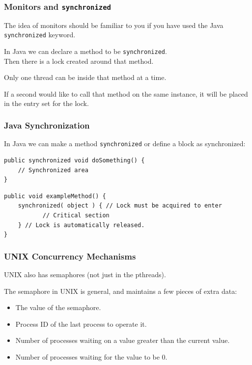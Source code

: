 \begin{frame}
\frametitle{Monitors and \texttt{synchronized}}

The idea of monitors should be familiar to you if you have used the Java \texttt{synchronized} keyword. 

In Java we can declare a method to be \texttt{synchronized}.\\
\quad Then there is a lock created around that method. 

Only one thread can be inside that method at a time.

If a second would like to call that method on the same instance, it will be placed in the entry set for the lock.

\end{frame}

\begin{frame}[fragile]
\frametitle{Java Synchronization}


In Java we can make a method \texttt{synchronized} or define a block as synchronized:

\begin{verbatim}
public synchronized void doSomething() {
    // Synchronized area
}
\end{verbatim}



\begin{verbatim}
public void exampleMethod() {
    synchronized( object ) { // Lock must be acquired to enter
           // Critical section 
    } // Lock is automatically released.
}
\end{verbatim}


\end{frame}

\begin{frame}
\frametitle{UNIX Concurrency Mechanisms}

UNIX also has semaphores (not just in the pthreads). 

The semaphore in UNIX is general, and maintains a few pieces of extra data:

\begin{itemize}
    \item The value of the semaphore.
    \item Process ID of the last process to operate it.
    \item Number of processes waiting on a value greater than the current value.
    \item Number of processes waiting for the value to be 0.
\end{itemize}

\end{frame}

